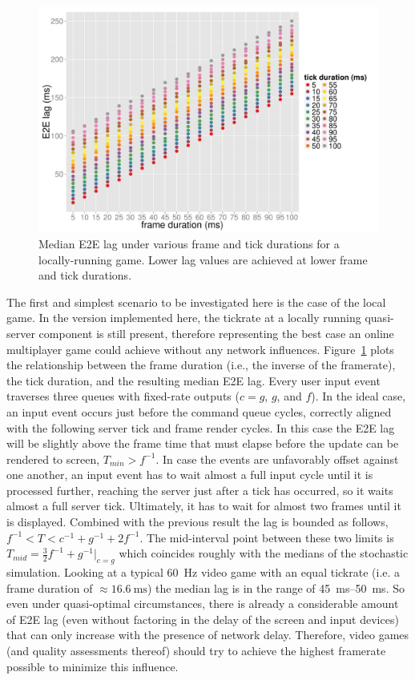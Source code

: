 \begin{figure}[!t]
	\centering
	\includegraphics[width=1.0\columnwidth]{../../../simulation/visualization/nwless-onlinegame-1000rounds.pdf}
	\caption{Median \acrshort{E2E} lag under various frame and tick durations for a locally-running game. Lower lag values are achieved at lower frame and tick durations.}
\label{fig:nwless-scatter}
\end{figure}

The first and simplest scenario to be investigated here is the case of the local game. In the version implemented here, the tickrate at a locally running quasi-server component is still present, therefore representing the best case an online multiplayer game could achieve without any network influences. Figure~\ref{fig:nwless-scatter} plots the relationship between the frame duration (i.e., the inverse of the framerate), the tick duration, and the resulting median \gls{E2E} lag. Every user input event traverses three queues with fixed-rate outputs ($c=g$, $g$, and $f$). In the ideal case, an input event occurs just before the command queue cycles, correctly aligned with the following server tick and frame render cycles. In this case the \gls{E2E} lag will be slightly above the frame time that must elapse before the update can be rendered to screen, $T_{min}>f^{-1}$. In case the events are unfavorably offset against one another, an input event has to wait almost a full input cycle until it is processed further, reaching the server just after a tick has occurred, so it waits almost a full server tick. Ultimately, it has to wait for almost two frames until it is displayed. Combined with the previous result the lag is bounded as follows, $f^{-1} < T < c^{-1}+g^{-1}+2f^{-1}$. The mid-interval point between these two limits is $T_{mid}=\frac{3}{2} f^{-1} + g^{-1}|_{c=g}$ which coincides roughly with the medians of the stochastic simulation. Looking at a typical \SI{60}{\hertz} video game with an equal tickrate (i.e. a frame duration of $\approx \SI{16.6}{\milli\second}$) the median lag is in the range of \SIrange{45}{50}{\milli\second}. So even under quasi-optimal circumstances, there is already a considerable amount of \gls{E2E} lag (even without factoring in the delay of the screen and input devices) that can only increase with the presence of network delay. Therefore, video games (and quality assessments thereof) should try to achieve the highest framerate possible to minimize this influence.

